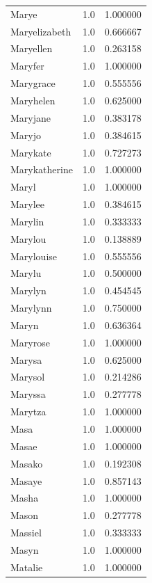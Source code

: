 \documentclass[
  letterpaper,
  DIV=11,
  numbers=noendperiod]{scrreprt}
\begin{document}
\begin{tabular}{lrr}
Marye           &   1.0 &   1.000000 \\
Maryelizabeth   &   1.0 &   0.666667 \\
Maryellen       &   1.0 &   0.263158 \\
Maryfer         &   1.0 &   1.000000 \\
Marygrace       &   1.0 &   0.555556 \\
Maryhelen       &   1.0 &   0.625000 \\
Maryjane        &   1.0 &   0.383178 \\
Maryjo          &   1.0 &   0.384615 \\
Marykate        &   1.0 &   0.727273 \\
Marykatherine   &   1.0 &   1.000000 \\
Maryl           &   1.0 &   1.000000 \\
Marylee         &   1.0 &   0.384615 \\
Marylin         &   1.0 &   0.333333 \\
Marylou         &   1.0 &   0.138889 \\
Marylouise      &   1.0 &   0.555556 \\
Marylu          &   1.0 &   0.500000 \\
Marylyn         &   1.0 &   0.454545 \\
Marylynn        &   1.0 &   0.750000 \\
Maryn           &   1.0 &   0.636364 \\
Maryrose        &   1.0 &   1.000000 \\
Marysa          &   1.0 &   0.625000 \\
Marysol         &   1.0 &   0.214286 \\
Maryssa         &   1.0 &   0.277778 \\
Marytza         &   1.0 &   1.000000 \\
Masa            &   1.0 &   1.000000 \\
Masae           &   1.0 &   1.000000 \\
Masako          &   1.0 &   0.192308 \\
Masaye          &   1.0 &   0.857143 \\
Masha           &   1.0 &   1.000000 \\
Mason           &   1.0 &   0.277778 \\
Massiel         &   1.0 &   0.333333 \\
Masyn           &   1.0 &   1.000000 \\
Matalie         &   1.0 &   1.000000 \\

\end{tabular}
\end{document}
